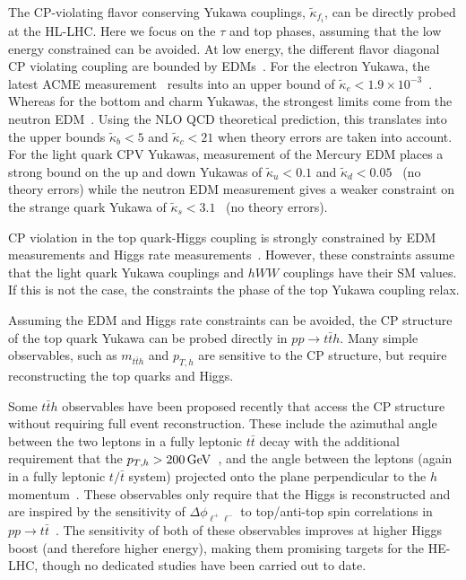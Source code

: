 \documentclass[../report.tex]{subfiles}
\begin{document}
The CP-violating flavor conserving Yukawa couplings, $\tilde \kappa_{f_i}$, can be directly probed at the HL-LHC. Here we focus on the $\tau$ and top phases, assuming that the low energy constrained can be avoided. 
At low energy, the different flavor diagonal CP violating coupling are bounded by EDMs~\cite{Brod:2013cka,Chien:2015xha,Altmannshofer:2015qra,Brod:2018pli}. 
For the electron Yukawa, the latest ACME measurement~\cite{Baron:2013eja,Andreev:2018ayy} results into an upper bound of $\tilde\kappa_e<1.9\times 10^{-3}$~\cite{Altmannshofer:2015qra}. Whereas for the bottom and charm Yukawas, the strongest limits come from the neutron EDM~\cite{Brod:2018pli}. Using the NLO QCD theoretical prediction, this translates into the upper bounds $\tilde\kappa_b<5$ and $\tilde\kappa_c<21$ when theory errors are taken into account.
For the light quark CPV Yukawas, measurement of the Mercury EDM places a strong bound on the up and down Yukawas of $\tilde\kappa_u<0.1$ and $\tilde\kappa_d<0.05$~\cite{Brod:2018xyz} (no theory errors) while the neutron EDM measurement gives a weaker constraint on the strange quark Yukawa of $\tilde\kappa_s<3.1$~\cite{Brod:2018xyz} (no theory errors).







CP violation in the top quark-Higgs coupling is strongly constrained by EDM measurements and Higgs rate measurements~\cite{Brod:2013cka}. However, these constraints assume that the light quark Yukawa couplings and $hWW$ couplings have their SM values. If this is not the case, the constraints the phase of the top Yukawa coupling relax.
    
Assuming the EDM and Higgs rate  constraints can be avoided, the CP structure of the top quark Yukawa can be probed directly in $pp \to t\bar t h$. Many simple observables, such as $m_{t\bar t h}$ and $p_{T,h}$ are sensitive to the CP structure, but require reconstructing the top quarks and Higgs.

Some $t\bar t h$ observables have been proposed recently that access the CP structure without requiring full event reconstruction. These include the azimuthal angle between the two leptons in a fully leptonic $t\bar{t}$ decay with the additional requirement that the $p_{T,h} > 200\, \text{\ensuremath{\text{GeV}}}$~\cite{Buckley:2015vsa}, and the angle between the leptons (again in a fully leptonic $t/\bar t$ system) projected onto the plane perpendicular to the $h$ momentum~\cite{Boudjema:2015nda}. These observables only require that the Higgs is reconstructed and are inspired by the sensitivity of $\Delta \phi_{\ell^+\ell^-}$ to top/anti-top spin correlations in $pp \to t\bar t$~\cite{Mahlon:1995zn}. The sensitivity of both of these observables improves at higher Higgs boost (and therefore higher energy), making them promising targets for the HE-LHC, though no dedicated studies have been carried out to date.
\end{document}
